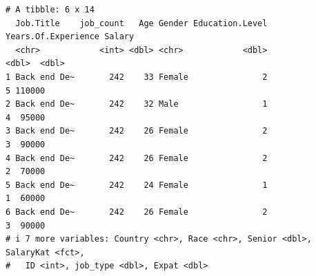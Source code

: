 \documentclass[
  letterpaper,
  DIV=11,
  numbers=noendperiod]{scrartcl}
\newenvironment{Shaded}{\begin{snugshade}}{\end{snugshade}}
\newcommand{\ConstantTok}[1]{\textcolor[rgb]{0.56,0.35,0.01}{#1}}
\newcommand{\DecValTok}[1]{\textcolor[rgb]{0.68,0.00,0.00}{#1}}
\newcommand{\FunctionTok}[1]{\textcolor[rgb]{0.28,0.35,0.67}{#1}}
\newcommand{\NormalTok}[1]{\textcolor[rgb]{0.00,0.23,0.31}{#1}}
\newcommand{\OtherTok}[1]{\textcolor[rgb]{0.00,0.23,0.31}{#1}}
\newcommand{\SpecialCharTok}[1]{\textcolor[rgb]{0.37,0.37,0.37}{#1}}
\newcommand{\StringTok}[1]{\textcolor[rgb]{0.13,0.47,0.30}{#1}}
\begin{document}
\begin{Shaded}
\end{Shaded}

\begin{verbatim}
# A tibble: 6 x 14
  Job.Title    job_count   Age Gender Education.Level Years.Of.Experience Salary
  <chr>            <int> <dbl> <chr>            <dbl>               <dbl>  <dbl>
1 Back end De~       242    33 Female               2                   5 110000
2 Back end De~       242    32 Male                 1                   4  95000
3 Back end De~       242    26 Female               2                   3  90000
4 Back end De~       242    26 Female               2                   2  70000
5 Back end De~       242    24 Female               1                   1  60000
6 Back end De~       242    26 Female               2                   3  90000
# i 7 more variables: Country <chr>, Race <chr>, Senior <dbl>, SalaryKat <fct>,
#   ID <int>, job_type <dbl>, Expat <dbl>
\end{verbatim}
\end{document}
